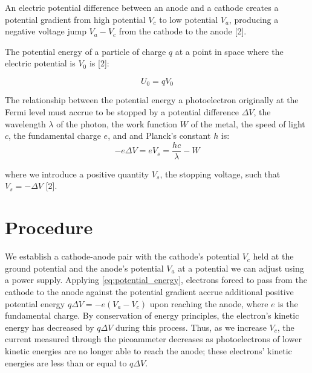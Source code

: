 \documentclass[11pt]{article}
\begin{document}
An electric potential difference between an anode and a cathode creates a
potential gradient from high potential $V_c$ to low potential $V_a$,
producing a negative voltage jump $V_a - V_c$ from the cathode to the
anode [2].

\vspace{1em}

The potential energy of a particle of charge $q$ at a
point in space where the electric potential is $V_0$ is [2]:

\begin{equation}
  \label{eq:potential_energy}
  U_0 = q V_0
\end{equation}

\vspace{1em}

The relationship between the potential energy a photoelectron
originally at the Fermi level must accrue to be stopped by a
potential difference $\Delta V$, the wavelength $\lambda$ of the
photon, the work function $W$ of the metal, the speed of light $c$,
the fundamental charge $e$, and
and Planck's constant $h$ is:
\begin{equation}
  \label{eq:photoelectric}
  -e \Delta V = eV_s = \frac{hc}{\lambda} - W
\end{equation}

where we introduce a positive quantity $V_s$, the stopping voltage,
such that $V_s = -\Delta V$ [2].

\section{Procedure}

We establish a cathode-anode pair with the cathode's potential $V_c$
held at the ground potential and the anode's potential $V_a$ at a
potential we can adjust
using a power supply. Applying \eqref{eq:potential_energy}, electrons
forced to pass
from the cathode to the
anode against the potential gradient accrue additional positive potential
energy $q\Delta V = -e(V_a - V_c)$ upon reaching the anode, where $e$ is the
fundamental charge. By conservation of energy principles, the electron's
kinetic energy has decreased by $q\Delta V$ during this process.
Thus, as we increase $V_c$, the current measured through the
picoammeter decreases as photoelectrons of lower kinetic energies are
no longer able to reach the anode; these electrons' kinetic energies are less
than or equal to $q\Delta V$.

\vspace{1em}
\end{document}
